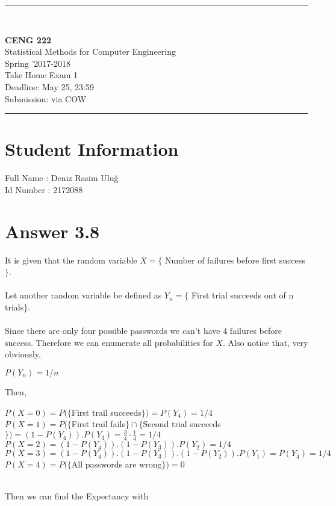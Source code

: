 \documentclass[12pt]{article}
\newcommand{\HRule}{\rule{\linewidth}{1mm}}
\begin{document}
\noindent
\HRule \\[3mm]
\begin{flushright}

                                         \LARGE \textbf{CENG 222}  \\[4mm]
                                         \Large Statistical Methods for Computer Engineering \\[4mm]
                                        \normalsize      Spring '2017-2018 \\
                                           \Large   Take Home Exam 1 \\
                    \normalsize Deadline: May 25, 23:59 \\
                    \normalsize Submission: via COW
\end{flushright}
\HRule

\section*{Student Information }
Full Name : Deniz Rasim Uluğ \\
Id Number : 2172088 \\

\section*{Answer 3.8}

It is given that the random variable $X=\{$ Number of failures before first success$\}$.\\\\
Let another random variable be defined as $Y_{n} = \{$ First trial succeeds out of n trials$\}$. \\\\

Since there are only four possible passwords we can't have $4$ failures before success. Therefore we can enumerate all probabilities for $X$. Also notice that, very obviously,
\begin{center}
$P(Y_n) = 1/n$
\end{center}

Then,\\
\begin{frame}

$P(X=0) = P( \{$First trail succeeds$\} ) = P(Y_4) = 1/4$\\
$P(X=1) = P( \{$First trail fails$\} \cap \{$Second trial succeeds$\} ) = (1-P(Y_4)).P(Y_3) =\frac{3}{4} \cdot \frac{1}{4} = 1/4$\\
$P(X=2) =  (1-P(Y_4)).(1-P(Y_3)).P(Y_2) = 1/4$\\
$P(X=3) = (1-P(Y_4)).(1-P(Y_3)).(1-P(Y_2)).P(Y_1) = P(Y_4) = 1/4$\\
$P(X=4) = P( \{$All passwords are wrong$\} ) = 0$
\end{frame}\\
Then we can find the Expectancy with
\end{document}
